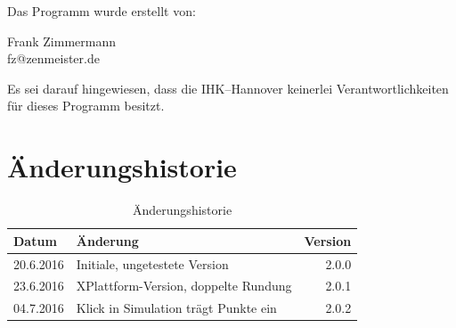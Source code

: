 \documentclass[a4paper,notitlepage,parskip=half]{scrartcl}
\begin{document}
Das Programm wurde erstellt von:

Frank Zimmermann\\
fz@zenmeister.de

Es sei darauf hingewiesen, dass die IHK--Hannover keinerlei Verantwortlichkeiten für dieses Programm besitzt.
\section{Änderungshistorie}
\begin{table}[H]\centering
\begin{tabular}{|l|l|r|}
\hline
Datum & Änderung &Version\\
\hline
20.6.2016&	Initiale, ungetestete Version		&  2.0.0\\
23.6.2016&	XPlattform-Version, doppelte Rundung&  2.0.1\\
04.7.2016&	Klick in Simulation trägt Punkte ein&  2.0.2\\
\hline
\end{tabular}
\caption{Änderungshistorie}
\end{table}
\end{document}
